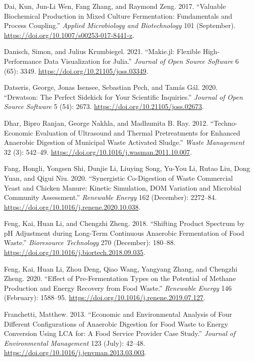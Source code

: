 \documentclass[11pt]{report}
\begin{document}
\begin{hangparas}{1.5em}{1}
\hypertarget{citeproc_bib_item_16}{Dai, Kun, Jun-Li Wen, Fang Zhang, and Raymond Zeng. 2017. “Valuable Biochemical Production in Mixed Culture Fermentation: Fundamentals and Process Coupling.” \textit{Applied Microbiology and Biotechnology} 101 (September). \url{https://doi.org/10.1007/s00253-017-8441-z}.}

\hypertarget{citeproc_bib_item_17}{Danisch, Simon, and Julius Krumbiegel. 2021. “Makie.jl: Flexible High-Performance Data Visualization for Julia.” \textit{Journal of Open Source Software} 6 (65): 3349. \url{https://doi.org/10.21105/joss.03349}.}

\hypertarget{citeproc_bib_item_18}{Datseris, George, Jonas Isensee, Sebastian Pech, and Tamás Gál. 2020. “Drwatson: The Perfect Sidekick for Your Scientific Inquiries.” \textit{Journal of Open Source Software} 5 (54): 2673. \url{https://doi.org/10.21105/joss.02673}.}

\hypertarget{citeproc_bib_item_19}{Dhar, Bipro Ranjan, George Nakhla, and Madhumita B. Ray. 2012. “Techno-Economic Evaluation of Ultrasound and Thermal Pretreatments for Enhanced Anaerobic Digestion of Municipal Waste Activated Sludge.” \textit{Waste Management} 32 (3): 542–49. \url{https://doi.org/10.1016/j.wasman.2011.10.007}.}

\hypertarget{citeproc_bib_item_20}{Fang, Hongli, Yongsen Shi, Dunjie Li, Liuying Song, Yu-You Li, Rutao Liu, Dong Yuan, and Qigui Niu. 2020. “Synergistic Co-Digestion of Waste Commercial Yeast and Chicken Manure: Kinetic Simulation, DOM Variation and Microbial Community Assessment.” \textit{Renewable Energy} 162 (December): 2272–84. \url{https://doi.org/10.1016/j.renene.2020.10.038}.}

\hypertarget{citeproc_bib_item_21}{Feng, Kai, Huan Li, and Chengzhi Zheng. 2018. “Shifting Product Spectrum by pH Adjustment during Long-Term Continuous Anaerobic Fermentation of Food Waste.” \textit{Bioresource Technology} 270 (December): 180–88. \url{https://doi.org/10.1016/j.biortech.2018.09.035}.}

\hypertarget{citeproc_bib_item_22}{Feng, Kai, Huan Li, Zhou Deng, Qiao Wang, Yangyang Zhang, and Chengzhi Zheng. 2020. “Effect of Pre-Fermentation Types on the Potential of Methane Production and Energy Recovery from Food Waste.” \textit{Renewable Energy} 146 (February): 1588–95. \url{https://doi.org/10.1016/j.renene.2019.07.127}.}

\hypertarget{citeproc_bib_item_23}{Franchetti, Matthew. 2013. “Economic and Environmental Analysis of Four Different Configurations of Anaerobic Digestion for Food Waste to Energy Conversion Using LCA for: A Food Service Provider Case Study.” \textit{Journal of Environmental Management} 123 (July): 42–48. \url{https://doi.org/10.1016/j.jenvman.2013.03.003}.}


\end{hangparas}
\end{document}
